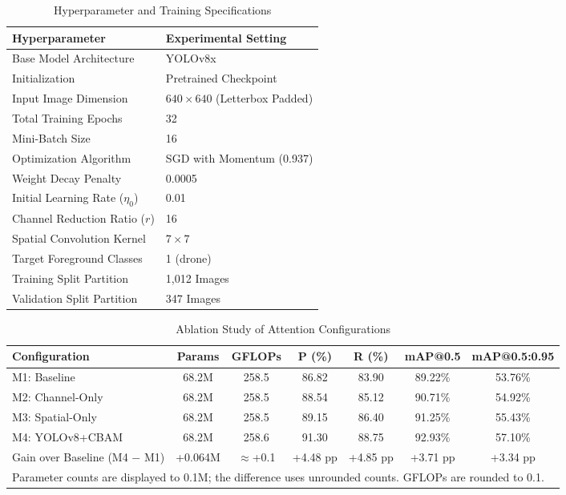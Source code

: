 \documentclass[conference]{IEEEtran}
\begin{document}
\begin{table}[!t]
\caption{Hyperparameter and Training Specifications}
\label{tab:hyper}
\centering
\renewcommand{\arraystretch}{1.1}
\begin{tabular}{|l|l|}
\hline
\textbf{Hyperparameter} & \textbf{Experimental Setting} \\
\hline
Base Model Architecture   & YOLOv8x \\
Initialization            & Pretrained Checkpoint \\
Input Image Dimension     & $640\times640$ (Letterbox Padded) \\
Total Training Epochs     & 32 \\
Mini-Batch Size           & 16 \\
Optimization Algorithm    & SGD with Momentum (0.937) \\
Weight Decay Penalty      & 0.0005 \\
Initial Learning Rate ($\eta_0$) & 0.01 \\
Channel Reduction Ratio ($r$)    & 16 \\
Spatial Convolution Kernel       & $7\times7$ \\
Target Foreground Classes        & 1 (drone) \\
Training Split Partition         & 1,012 Images \\
Validation Split Partition       & 347 Images \\
\hline
\end{tabular}
\end{table}

\begin{table}[!t]
\caption{Ablation Study of Attention Configurations}
\label{tab:ablation}
\centering
\renewcommand{\arraystretch}{1.1}
\begin{tabular}{|l|c|c|c|c|c|c|}
\hline
\textbf{Configuration} & \textbf{Params} & \textbf{GFLOPs} & \textbf{P (\%)} & \textbf{R (\%)} & \textbf{mAP@0.5} & \textbf{mAP@0.5:0.95} \\
\hline
M1: Baseline     & 68.2M & 258.5 & 86.82 & 83.90 & 89.22\% & 53.76\% \\
M2: Channel-Only & 68.2M & 258.5 & 88.54 & 85.12 & 90.71\% & 54.92\% \\
M3: Spatial-Only & 68.2M & 258.5 & 89.15 & 86.40 & 91.25\% & 55.43\% \\
M4: YOLOv8+CBAM  & 68.2M & 258.6 & 91.30 & 88.75 & 92.93\% & 57.10\% \\
\hline
Gain over Baseline (M4 $-$ M1) & +0.064M & $\approx$+0.1 & +4.48 pp & +4.85 pp & +3.71 pp & +3.34 pp \\
\hline
\multicolumn{7}{l}{\footnotesize Parameter counts are displayed to 0.1M; the difference uses unrounded counts. GFLOPs are rounded to 0.1.}\\
\end{tabular}
\end{table}
\end{document}
